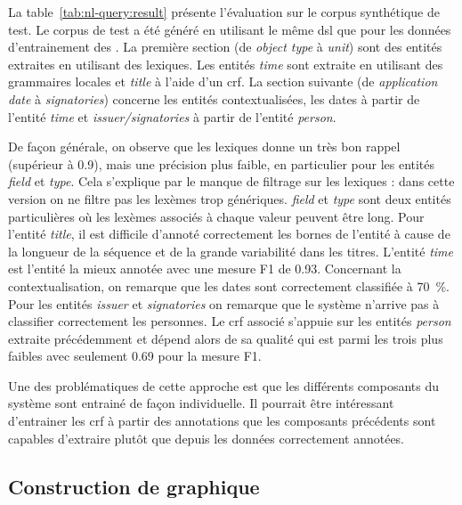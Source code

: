 La table~\ref{tab:nl-query:result} présente l'évaluation sur le corpus synthétique de test.
Le corpus de test a été généré en utilisant le même \gls{dsl} que pour les données d'entrainement des .
La première section (de \emph{object type} à \emph{unit}) sont des entités extraites en utilisant des lexiques.
Les entités \emph{time} sont extraite en utilisant des grammaires locales et \emph{title} à l'aide d'un \gls{crf}.
La section suivante (de \emph{application date} à \emph{signatories}) concerne les entités contextualisées, les dates à partir de l'entité \emph{time} et \emph{issuer/signatories} à partir de l'entité \emph{person}.

De façon générale, on observe que les lexiques donne un très bon rappel (supérieur à \num{0.9}), mais une précision plus faible, en particulier pour les entités \emph{field} et \emph{type}.
Cela s'explique par le manque de filtrage sur les lexiques : dans cette version on ne filtre pas les lexèmes trop génériques.
\emph{field} et \emph{type} sont deux entités particulières où les lexèmes associés à chaque valeur peuvent être long.
Pour l'entité \emph{title}, il est difficile d'annoté correctement les bornes de l'entité à cause de la longueur de la séquence et de la grande variabilité dans les titres.
L'entité \emph{time} est l'entité la mieux annotée avec une mesure F1 de \num{0.93}.
Concernant la contextualisation, on remarque que les dates sont correctement classifiée à \SI{70}{\percent}.
Pour les entités \emph{issuer} et \emph{signatories} on remarque que le système n'arrive pas à classifier correctement les personnes.
Le \gls{crf} associé s'appuie sur les entités \emph{person} extraite précédemment et dépend alors de sa qualité qui est parmi les trois plus faibles avec seulement \num{0.69} pour la mesure F1.

Une des problématiques de cette approche est que les différents composants du système sont entrainé de façon individuelle.
Il pourrait être intéressant d'entrainer les \gls{crf} à partir des annotations que les composants précédents sont capables d'extraire plutôt que depuis les données correctement annotées.

\FloatBarrier
\subsection{Construction de graphique}

